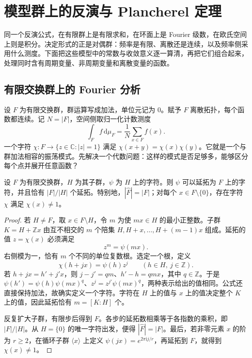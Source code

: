 \section{模型群上的反演与 Plancherel 定理}
\label{b2:sec:I204}

同一个反演公式，在有限群上是有限求和，在环面上是 Fourier 级数，在欧氏空间上则是积分。决定形式的正是对偶群：频率是有限、离散还是连续，以及频率侧采用什么测度。下面把这些模型中的常数与收敛意义逐一算清，再把它们组合起来，处理同时含有周期变量、非周期变量和离散变量的函数。

\subsection{有限交换群上的 Fourier 分析}
\label{b2:subsec:I20401}

设 \(F\) 为有限交换群，群运算写成加法，单位元记为 \(0\)。赋予 \(F\) 离散拓扑，每个函数都连续。记 \(N=|F|\)，空间侧取归一化计数测度
\[
 \int_F f\,\mathrm d\mu_F=\frac1N\sum_{x\in F}f(x).
\]
一个字符 \(\chi:F\rightarrow\{z\in\mathbb C:|z|=1\}\) 满足 \(\chi(x+y)=\chi(x)\chi(y)\)。它就是一个与群加法相容的振荡模式。先解决一个代数问题：这样的模式是否足够多，能够区分每个点并展开任意函数？

\begin{lemma}[有限交换群上的字符延拓]\label{b2:lem:I4-character-extension}
设 \(F\) 为有限交换群，\(H\) 为其子群，\(\psi\) 为 \(H\) 上的字符。则 \(\psi\) 可以延拓为 \(F\) 上的字符，并且恰有 \(|F|/|H|\) 个延拓。特别地，\(|\widehat F|=|F|\)；对每个 \(x\in F\setminus\{0\}\)，存在字符 \(\chi\) 满足 \(\chi(x)\ne1\)。
\end{lemma}
\begin{proof}
若 \(H\ne F\)，取 \(x\in F\setminus H\)，令 \(m\) 为使 \(mx\in H\) 的最小正整数。子群 \(K=H+\mathbb Zx\) 由互不相交的 \(m\) 个陪集 \(H,H+x,\ldots,H+(m-1)x\) 组成。延拓的值 \(z=\chi(x)\) 必须满足
\[
 z^m=\psi(mx).
\]
右侧模为一，恰有 \(m\) 个不同的单位复数根。选定一个根，定义
\[
 \chi(h+jx)=\psi(h)z^j\qquad(h\in H,\ j\in\mathbb Z).
\]
若 \(h+jx=h'+j'x\)，则 \(j-j'=qm\)、\(h'-h=qmx\)，其中 \(q\in\mathbb Z\)。于是 \(\psi(h')=\psi(h)\psi(mx)^q\)、\(z^j=z^{j'}\psi(mx)^q\)，两种表示给出的值相同。公式还直接保持加法，故确实定义一个字符。字符在 \(H\) 上的值与 \(x\) 上的值决定整个 \(K\) 上的值，因此延拓恰有 \(m=[K:H]\) 个。

反复扩大子群，有限步后得到 \(F\)。各步的延拓数相乘等于各指数的乘积，即 \(|F|/|H|\)。从 \(H=\{0\}\) 的唯一字符出发，便得 \(|\widehat F|=|F|\)。最后，若非零元素 \(x\) 的阶为 \(r\ge2\)，在循环子群 \(\langle x\rangle\) 上定义 \(\psi(jx)=e^{2\pi\mathrm i j/r}\)，再延拓到 \(F\)，就得到 \(\chi(x)\ne1\)。
\end{proof}


